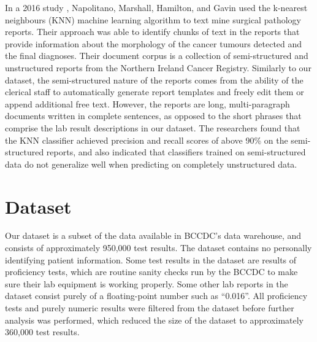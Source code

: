 \documentclass[12pt]{article}
\begin{document}
In a 2016 study \cite{machine_learning_classification_of}, Napolitano, Marshall, Hamilton, and Gavin used the k-nearest neighbours (KNN) machine learning algorithm to text mine surgical pathology reports. Their approach was able to identify chunks of text in the reports that provide information about the morphology of the cancer tumours detected and the final diagnoses. Their document corpus is a collection of semi-structured and unstructured reports from the Northern Ireland Cancer Registry. Similarly to our dataset, the semi-structured nature of the reports comes from the ability of the clerical staff to automatically generate report templates and freely edit them or append additional free text. However, the reports are long, multi-paragraph documents written in complete sentences, as opposed to the short phrases that comprise the lab result descriptions in our dataset. The researchers found that the KNN classifier achieved precision and recall scores of above 90\% on the semi-structured reports, and also indicated that classifiers trained on semi-structured data do not generalize well when predicting on completely unstructured data.




\section{Dataset}

Our dataset is a subset of the data available in BCCDC's data warehouse, and consists of approximately 950,000 test results. The dataset contains no personally identifying patient information. Some test results in the dataset are results of proficiency tests, which are routine sanity checks run by the BCCDC to make sure their lab equipment is working properly. Some other lab reports in the dataset consist purely of a floating-point number such as ``0.016''. All proficiency tests and purely numeric results were filtered from the dataset before further analysis was performed, which reduced the size of the dataset to approximately 360,000 test results.
\end{document}
